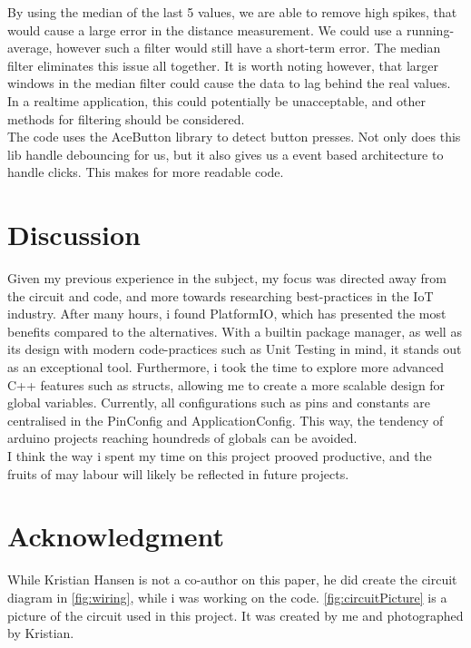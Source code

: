 \documentclass[journal]{IEEEtran}
\begin{document}
\begin{multicols}{2}

    By using the median of the last 5 values, we are able to remove high spikes, that would
    cause a large error in the distance measurement. We could use a running-average, however
    such a filter would still have a short-term error. The median filter eliminates
    this issue all together. It is worth noting however, that larger windows in the median filter
    could cause the data to lag behind the real values. In a realtime application, this could
    potentially be unacceptable, and other methods for filtering should be considered.\\

    The code uses the AceButton library to detect button presses. Not only does this lib
    handle debouncing for us, but it also gives us a event based architecture to handle
    clicks. This makes for more readable code.

    \section{Discussion}
    Given my previous experience in the subject, my focus was directed away from
    the circuit and code, and more towards researching best-practices in the IoT industry.
    After many hours, i found PlatformIO, which has presented the most benefits compared
    to the alternatives. With a builtin package manager, as well as its design with modern
    code-practices such as Unit Testing in mind, it stands out as an exceptional tool.
    Furthermore, i took the time to explore more advanced C++ features such as structs,
    allowing me to create a more scalable design for global variables. Currently, all
    configurations such as pins and constants are centralised in the PinConfig and ApplicationConfig.
    This way, the tendency of arduino projects reaching houndreds of globals can be avoided.\\

    I think the way i spent my time on this project prooved productive, and the fruits of may
    labour will likely be reflected in future projects.

    \section*{Acknowledgment}
    While Kristian Hansen is not a co-author on this paper,
    he did create the circuit diagram in \autoref{fig:wiring},
    while i was working on the code.
    \autoref{fig:circuitPicture}
    is a picture of the circuit used in this project.
    It was created by me and photographed by Kristian.
\end{multicols}
\end{document}
